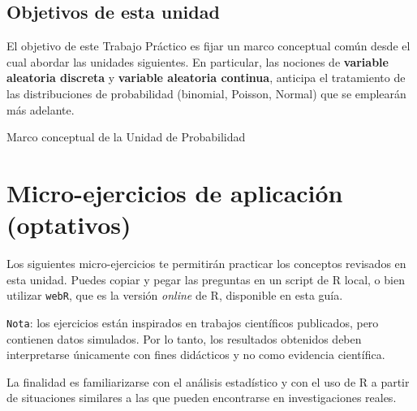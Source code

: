 \documentclass[
  spanish,
  letterpaper,
  DIV=11,
  numbers=noendperiod]{scrreprt}
\begin{document}
\subsection{Objetivos de esta unidad}\label{objetivos-de-esta-unidad}

El objetivo de este Trabajo Práctico es fijar un marco conceptual común
desde el cual abordar las unidades siguientes. En particular, las
nociones de \textbf{variable aleatoria discreta} y \textbf{variable
aleatoria continua}, anticipa el tratamiento de las distribuciones de
probabilidad (binomial, Poisson, Normal) que se emplearán más adelante.

Marco conceptual de la Unidad de Probabilidad

\section{Micro-ejercicios de aplicación
(optativos)}\label{micro-ejercicios-de-aplicaciuxf3n-optativos-2}

Los siguientes micro-ejercicios te permitirán practicar los conceptos
revisados en esta unidad. Puedes copiar y pegar las preguntas en un
script de R local, o bien utilizar \texttt{webR}, que es la versión
\emph{online} de R, disponible en esta guía.

\texttt{Nota}: los ejercicios están inspirados en trabajos científicos
publicados, pero contienen datos simulados. Por lo tanto, los resultados
obtenidos deben interpretarse únicamente con fines didácticos y no como
evidencia científica.

La finalidad es familiarizarse con el análisis estadístico y con el uso
de R a partir de situaciones similares a las que pueden encontrarse en
investigaciones reales.
\end{document}
